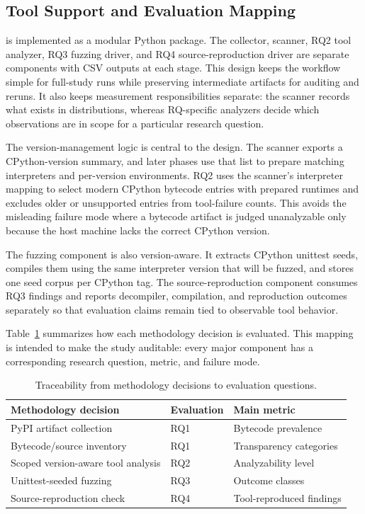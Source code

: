 
\subsection{Tool Support and Evaluation Mapping}\label{sec:method:tools}

{\tech} is implemented as a modular Python package.  The collector, scanner, RQ2 tool analyzer, RQ3 fuzzing driver, and RQ4 source-reproduction driver are separate components with CSV outputs at each stage.  This design keeps the workflow simple for full-study runs while preserving intermediate artifacts for auditing and reruns.  It also keeps measurement responsibilities separate: the scanner records what exists in distributions, whereas RQ-specific analyzers decide which observations are in scope for a particular research question.

The version-management logic is central to the design.  The scanner exports a CPython-version summary, and later phases use that list to prepare matching interpreters and per-version environments.  RQ2 uses the scanner's interpreter mapping to select modern CPython bytecode entries with prepared runtimes and excludes older or unsupported entries from tool-failure counts.  This avoids the misleading failure mode where a bytecode artifact is judged unanalyzable only because the host machine lacks the correct CPython version.

The fuzzing component is also version-aware.  It extracts CPython unittest seeds, compiles them using the same interpreter version that will be fuzzed, and stores one seed corpus per CPython tag.  The source-reproduction component consumes RQ3 findings and reports decompiler, compilation, and reproduction outcomes separately so that evaluation claims remain tied to observable tool behavior.

Table~\ref{tab:design-eval-map} summarizes how each methodology decision is evaluated.  This mapping is intended to make the study auditable: every major component has a corresponding research question, metric, and failure mode.

\begin{table}[t]
  \centering
  \caption{Traceability from methodology decisions to evaluation questions.}
  \label{tab:design-eval-map}
  \begin{tabular}{lll}
    \toprule
    Methodology decision & Evaluation & Main metric \\
    \midrule
    PyPI artifact collection & RQ1 & Bytecode prevalence \\
    Bytecode/source inventory & RQ1 & Transparency categories \\
    Scoped version-aware tool analysis & RQ2 & Analyzability level \\
    Unittest-seeded fuzzing & RQ3 & Outcome classes \\
    Source-reproduction check & RQ4 & Tool-reproduced findings \\
    \bottomrule
  \end{tabular}
\end{table}

